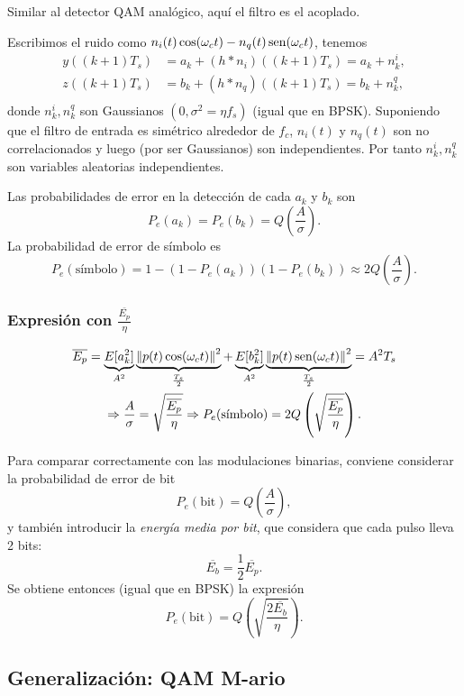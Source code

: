 Similar al detector QAM analógico, aquí el filtro es el acoplado.

Escribimos el ruido como $n_i(t)\cos(\omega_ct)-n_q(t)\operatorname{sen}(\omega_ct)$, tenemos
\begin{align*}
    y((k+1)T_s) &= a_k + (h\ast n_i)((k+1)T_s) = a_k + n_k^i,\\
    z((k+1)T_s) &= b_k + (h\ast n_q)((k+1)T_s) = b_k + n_k^q,\\
\end{align*}
donde $n_k^i, n_k^q$ son Gaussianos $(0,\sigma^2=\eta f_s)$ (igual
que en BPSK). Suponiendo que el filtro de entrada es simétrico
alrededor de $f_c$, $n_i(t)$ y $n_q(t)$ son no correlacionados y
luego (por ser Gaussianos) son independientes. Por tanto $n_k^i,
n_k^q$ son variables aleatorias independientes.

Las probabilidades de error en la detección de cada $a_k$ y $b_k$
son
\[P_e(a_k) = P_e(b_k) = Q\left(\frac{A}{\sigma}\right).\]
La probabilidad de error de símbolo es
\[
P_e(\text{símbolo})= 1 - (1-P_e(a_k))(1-P_e(b_k)) \approx 2
Q\left(\frac{A}{\sigma}\right).\]

\subsubsection*{Expresión con $\frac{\overline{E_p}}{\eta}$}

\begin{gather*}
    \overline{E_p}=\underbrace{E[a_k^2]}_{A^2} \underbrace{\left\|p(t)\cos(\omega_ct)\right\|^2}_{\frac{T_s}{2}} + \underbrace{E[b_k^2]}_{A^2} \underbrace{\left\|p(t)\operatorname{sen}(\omega_ct)\right\|^2}_{\frac{T_s}{2}} = A^2 T_s\\
    \Rightarrow \frac{A}{\sigma}=\sqrt{\frac{\overline{E_p}}{\eta}}
    \Rightarrow  P_e(\text{símbolo})  = 2
    Q\left(\sqrt{\frac{\overline{E_p}}{\eta}}\right).
\end{gather*}

Para comparar correctamente con las modulaciones binarias,
conviene considerar la probabilidad de error de bit
\[
P_e(\text{bit})=Q\left(\frac{A}{\sigma}\right),\] y también
introducir la \emph{energía media por bit}, que considera que
cada pulso lleva 2 bits:
\[
\overline{E_b} = \frac{1}{2}\overline{E_p}.
\]
Se obtiene entonces (igual que en BPSK) la expresión
\[
P_e(\text{bit}) = Q\left(\sqrt{\frac{2
\overline{E_b}}{\eta}}\right).
\]


\subsection*{Generalización: QAM M-ario}

